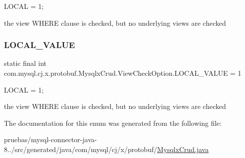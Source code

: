 {\ttfamily L\+O\+C\+AL = 1;}


\begin{DoxyPre}
the view WHERE clause is checked, but no underlying views are checked
\end{DoxyPre}
 \mbox{\label{enumcom_1_1mysql_1_1cj_1_1x_1_1protobuf_1_1_mysqlx_crud_1_1_view_check_option_a2cdae5757280587dd0588a361144d36b}} 
\subsubsection{\texorpdfstring{L\+O\+C\+A\+L\+\_\+\+V\+A\+L\+UE}{LOCAL\_VALUE}}
{\footnotesize\ttfamily  static  final int com.\+mysql.\+cj.\+x.\+protobuf.\+Mysqlx\+Crud.\+View\+Check\+Option.\+L\+O\+C\+A\+L\+\_\+\+V\+A\+L\+UE = 1\hspace{0.3cm}{\ttfamily [static]}}

{\ttfamily L\+O\+C\+AL = 1;}


\begin{DoxyPre}
the view WHERE clause is checked, but no underlying views are checked
\end{DoxyPre}
 

The documentation for this enum was generated from the following file\+:\begin{DoxyCompactItemize}
\item 
pruebas/mysql-\/connector-\/java-\/8../src/generated/java/com/mysql/cj/x/protobuf/\mbox{\hyperlink{_mysqlx_crud_8java}{Mysqlx\+Crud.\+java}}\end{DoxyCompactItemize}
